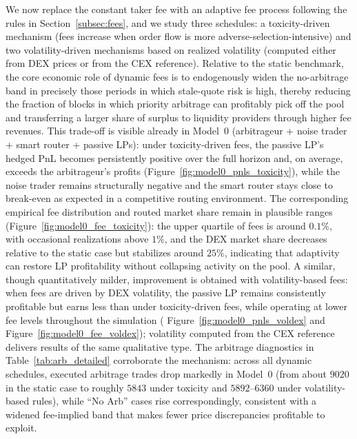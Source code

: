 \documentclass[11pt]{article}
\begin{document}
We now replace the constant taker fee with an adaptive fee process following the rules in Section~\ref{subsec:fees}, and 
we study three schedules: a toxicity-driven mechanism (fees increase when order flow is more adverse-selection-intensive) 
and two volatility-driven mechanisms based on realized volatility (computed either from DEX prices or from the CEX reference). 
Relative to the static benchmark, the core economic role of dynamic fees is to endogenously widen the no-arbitrage band in 
precisely those periods in which stale-quote risk is high, thereby reducing the fraction of blocks in which priority arbitrage 
can profitably pick off the pool and transferring a larger share of surplus to liquidity providers through higher fee revenues. 
This trade-off is visible already in Model~0 (arbitrageur + noise trader + smart router + passive LPs): under toxicity-driven fees, 
the passive LP’s hedged PnL becomes persistently positive over the full horizon and, on average, exceeds the arbitrageur’s profits
 (Figure~\ref{fig:model0_pnls_toxicity}), while the noise trader remains structurally negative and the smart router stays close to 
 break-even as expected in a competitive routing environment. The corresponding empirical fee distribution and routed market share 
 remain in plausible ranges (Figure~\ref{fig:model0_fee_toxicity}): the upper quartile of fees is around $0.1\%$, with occasional 
 realizations above $1\%$, and the DEX market share decreases relative to the static case but stabilizes around $25\%$, indicating 
 that adaptivity can restore LP profitability without collapsing activity on the pool. A similar, though quantitatively milder, 
 improvement is obtained with volatility-based fees: when fees are driven by DEX volatility, the passive LP remains consistently 
 profitable but earns less than under toxicity-driven fees, while operating at lower fee levels throughout the simulation (
  Figure~\ref{fig:model0_pnls_voldex} and Figure~\ref{fig:model0_fee_voldex}); volatility computed from the CEX reference delivers 
  results of the same qualitative type. The arbitrage diagnostics in Table~\ref{tab:arb_detailed} corroborate the mechanism: across 
  all dynamic schedules, executed arbitrage trades drop markedly in Model~0 (from about $9020$ in the static case to roughly $5843$ 
  under toxicity and $5892$--$6360$ under volatility-based rules), while ``No Arb'' cases rise correspondingly, consistent with a 
  widened fee-implied band that makes fewer price discrepancies profitable to exploit.
\end{document}
